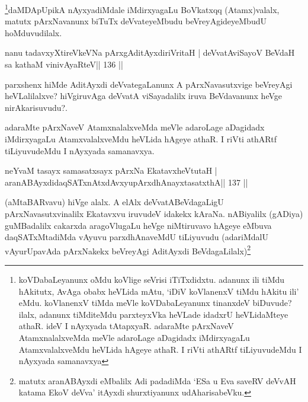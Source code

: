 \begin{artha}
\footnote{koVDabaLeyanunx oMdu koVlige seVrisi iTiTxdidxtu. adanunx ili  tiMdu hAkitutx, AvAga obabx heVLida mAtu, `iDiV koVlanenxV tiMdu hAkitu  ili' eMdu. koVlanenxV tiMda meVle koVDabaLeyanunx tinanxdeV biDuvude?  ilalx, adanunx tiMditeMdu parxteyxVka heVLade idadxrU heVLidaMteye athaR. ideV I nAyxyada tAtapxyaR. adaraMte pArxNaveV AtamxnalalxveMda meVle adaroLage aDagidadx  iMdirxyagaLu AtamxvalalxveMdu heVLida hAgeye athaR. I riVti athARtf tiLiyuvudeMdu I nAyxyada samanavxya}daMDApUpikA nAyxyadiMdale iMdirxyagaLu BoVkatxqq (Atamx)valalx, matutx pArxNavanunx biTuTx deVvateyeMbudu beVreyAgideyeMbudU hoMduvudilalx.
\end{artha}


\begin{shl}
nanu tadavxyXtireVkeVNa pArxgAditAyxdiriVritaH |
deVvatAviSayoV BeVdaH sa kathaM vinivAyaRteV\hfill || 136 ||
\end{shl}

\begin{artha}
parxshenx \ndash  hiMde AditAyxdi deVvategaLanunx A pArxNavasutxvige beVreyAgi heVLalilalxve? hiVgiruvAga deVvatA viSayadalilx iruva BeVdavanunx heVge nirAkarisuvudu?.

adaraMte pArxNaveV AtamxnalalxveMda meVle adaroLage aDagidadx iMdirxyagaLu AtamxvalalxveMdu heVLida hAgeye athaR. I riVti athARtf tiLiyuvudeMdu I nAyxyada samanavxya. 
\end{artha}





\begin{shl}
neYvaM tasayx samasatxsayx pArxNa EkatavxheVtutaH |
aranABAyxdidaqSATxnAtxdAvxyupArxdhAnayxtasatxthA\hfill || 137 ||
\end{shl}

\begin{artha}
(aMtaBARvavu) hiVge alalx. A elAlx deVvatABeVdagaLigU 
pArxNavasutxvinalilx Ekatavxvu iruvudeV idakekx kAraNa. nABiyalilx 
(gADiya) guMBadalilx cakarxda aragoVlugaLu heVge niMtiruvavo hAgeye 
eMbuva daqSATxMtadiMda vAyuvu parxdhAnaveMdU tiLiyuvudu (adariMdalU 
vAyurUpavAda pArxNakekx beVreyAgi AditAyxdi 
BeVdagaLilalx)\footnote{matutx aranABAyxdi eMbalilx Adi padadiMda `ESa 
u Eva saveRV deVvAH katama EkoV deVva' itAyxdi shurxtiyanunx udAharisabeVku.}
\end{artha}

